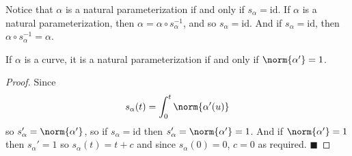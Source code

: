 \documentclass[10pt]{article}
\def\qed{%
    \ifmmode%
        \eqno\blacksquare%
    \else%
        \hskip1cm\allowbreak\hbox{}\nobreak\hfill$\blacksquare$%
    \fi%
}
\begin{document}
Notice that $\alpha$ is a natural parameterization if and only if $s_\alpha=\mathrm{id}$.
If $\alpha$ is a natural parameterization, then $\alpha=\alpha\circ s_\alpha^{-1}$, and so $s_\alpha=\mathrm{id}$.
And if $s_\alpha=\mathrm{id}$, then $\alpha\circ s_\alpha^{-1}=\alpha$.

\begin{prop*}

    If $\alpha$ is a curve, it is a natural parameterization if and only if $\norm{\alpha'}=1$.

\end{prop*}

\begin{proof}

    Since
    \[ s_\alpha(t) = \int_0^t \norm{\alpha'(u)} \]
    so $s_\alpha'=\norm{\alpha'}$, so if $s_\alpha=\mathrm{id}$ then $s_\alpha'=\norm{\alpha'}=1$.
    And if $\norm{\alpha'}=1$ then $s_\alpha'=1$ so $s_\alpha(t)=t+c$ and since $s_\alpha(0)=0$, $c=0$ as required.
    \qed

\end{proof}
\end{document}
